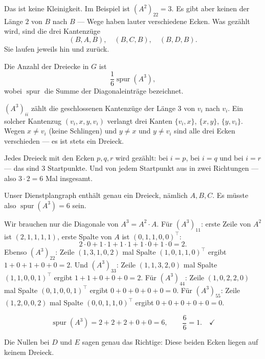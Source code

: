 \begin{warnung}
Das ist keine Kleinigkeit. Im Beispiel ist $(A^2)_{22} = 3$. Es gibt aber keinen  der Länge $2$ von $B$ nach $B$ --- Wege haben lauter verschiedene Ecken. Was gezählt wird, sind die drei Kantenzüge
\[ (B,A,B), \quad (B,C,B), \quad (B,D,B) . \]
Sie laufen jeweils hin und zurück.

\begin{center}
\begin{minipage}{0.88\textwidth}
\end{minipage}
\end{center}
\end{warnung}

\begin{merksatz}
Die Anzahl der Dreiecke in $G$ ist
\[ \frac{1}{6} \operatorname{spur}(A^3), \]
wobei $\operatorname{spur}$ die Summe der Diagonaleinträge bezeichnet.

$(A^3)_{ii}$ zählt die geschlossenen Kantenzüge der Länge $3$ von $v_i$ nach $v_i$. Ein solcher Kantenzug $(v_i, x, y, v_i)$ verlangt drei Kanten $\{v_i,x\}$, $\{x,y\}$, $\{y,v_i\}$. Wegen $x \neq v_i$ (keine Schlingen) und $y \neq x$ und $y \neq v_i$ sind alle drei Ecken verschieden --- es ist stets ein Dreieck.

Jedes Dreieck mit den Ecken $p,q,r$ wird gezählt: bei $i = p$, bei $i = q$ und bei $i = r$ --- das sind $3$ Startpunkte. Und von jedem Startpunkt aus in zwei Richtungen --- also $3 \cdot 2 = 6$ Mal insgesamt.

Unser Dienstplangraph enthält genau ein Dreieck, nämlich $A,B,C$. Es müsste also $\operatorname{spur}(A^3) = 6$ sein.

Wir brauchen nur die Diagonale von $A^3 = A^2 \cdot A$. Für $(A^3)_{11}$: erste Zeile von $A^2$ ist $(2,1,1,1,1)$, erste Spalte von $A$ ist $(0,1,1,0,0)^{\!\top}$:
\[ 2\cdot 0 + 1\cdot 1 + 1\cdot 1 + 1\cdot 0 + 1\cdot 0 = 2 . \]
Ebenso $(A^3)_{22}$: Zeile $(1,3,1,0,2)$ mal Spalte $(1,0,1,1,0)^{\!\top}$ ergibt $1 + 0 + 1 + 0 + 0 = 2$.
Und $(A^3)_{33}$: Zeile $(1,1,3,2,0)$ mal Spalte $(1,1,0,0,1)^{\!\top}$ ergibt $1+1+0+0+0 = 2$.
Für $(A^3)_{44}$: Zeile $(1,0,2,2,0)$ mal Spalte $(0,1,0,0,1)^{\!\top}$ ergibt $0+0+0+0+0 = 0$.
Für $(A^3)_{55}$: Zeile $(1,2,0,0,2)$ mal Spalte $(0,0,1,1,0)^{\!\top}$ ergibt $0+0+0+0+0 = 0$.

\[ \operatorname{spur}(A^3) = 2+2+2+0+0 = 6, \qquad \frac{6}{6} = 1 . \quad \checkmark \]

Die Nullen bei $D$ und $E$ sagen genau das Richtige: Diese beiden Ecken liegen auf keinem Dreieck.
\end{merksatz}


